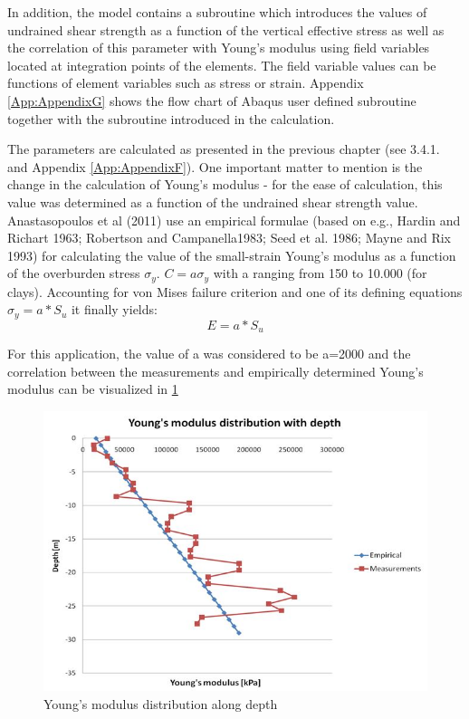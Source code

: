 \documentclass[10pt,a4paper]{report}
\begin{document}
In addition, the model contains a subroutine which introduces the values of undrained shear strength as a function of the vertical effective stress as well as the correlation of this parameter with Young's modulus using field variables located at integration points of the elements. The field variable values can be functions of element variables such as stress or strain. Appendix \ref{App:AppendixG} shows the flow chart of Abaqus user defined subroutine together with the subroutine introduced in the calculation.

The parameters are calculated as presented in the previous chapter (see 3.4.1.  and Appendix \ref{App:AppendixF}). One important matter to mention is the change in the calculation of Young's modulus - for the ease of calculation, this value was determined as a function of the undrained shear strength value. Anastasopoulos et al (2011) use an empirical formulae (based on e.g., Hardin and Richart 1963; Robertson and Campanella1983; Seed et al. 1986; Mayne and Rix 1993) for calculating the value of the small-strain Young's modulus as a function of the overburden stress $\sigma_y$. $C=a{\sigma }_{y}$ with a ranging from 150 to 10.000 (for clays). Accounting for von Mises failure criterion and one of its defining equations ${\sigma}_{y}=a*S_u$ it finally yields:
\begin{equation}
	E=a*S_u
\end{equation}

For this application, the value of a was considered to be a=2000 and the correlation between the measurements and empirically determined Young's modulus can be visualized in \ref{Young}

\begin{figure}[h!]
\centering
\includegraphics[width=0.7\linewidth]{"Young's modulus"}
\caption[]{Young's modulus distribution along depth}
\label{Young}
\end{figure}
\end{document}
